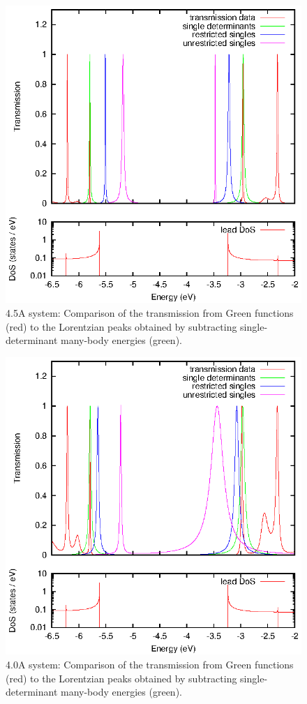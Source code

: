 \begin{figure}[h]
	\begin{center}
		\includegraphics[width=0.9\linewidth]{figures/nobrsingles45A.eps}
	\end{center}
	\caption{4.5A system: Comparison of the transmission from Green functions (red) to
	         the Lorentzian peaks obtained by subtracting
		 single-determinant many-body energies (green).}
	\label{fig:nobranch45A}
\end{figure}

\begin{figure}[h]
	\begin{center}
		\includegraphics[width=0.9\linewidth]{figures/nobrsingles40A.eps}
	\end{center}
	\caption{4.0A system: Comparison of the transmission from Green functions (red) to
		 the Lorentzian peaks obtained by subtracting
		 single-determinant many-body energies (green).}
	\label{fig:nobranch40A}
\end{figure}


